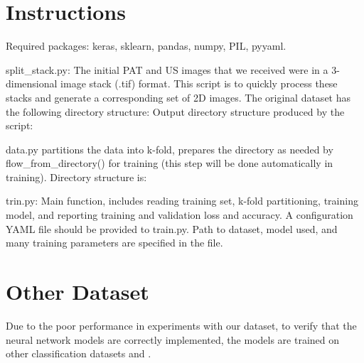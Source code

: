 \chapter{Instructions} %
\label{appendixA}

Required packages: keras, sklearn, pandas, numpy, PIL, pyyaml.

split\_stack.py: The initial PAT and US images that we received were in a 3-dimensional image stack (.tif) format. This script is to quickly process these stacks and generate a corresponding set of 2D images.
The original dataset has the following directory structure:
Output directory structure produced by the script:

data.py partitions the data into k-fold, prepares the directory as needed by flow\_from\_directory() for training (this step will be done automatically in training). Directory structure is:

trin.py: Main function, includes reading training set, k-fold partitioning, training model, and reporting training and validation loss and accuracy. A configuration YAML file should be provided to train.py. Path to dataset, model used, and many training parameters are specified in the file.


\chapter{Other Dataset}
\label{appendixB}
Due to the poor performance in experiments with our dataset, to verify that the neural network models are correctly implemented, the models are trained on other classification datasets \citep{Janowczyk2016} and \citep{catdog}.

